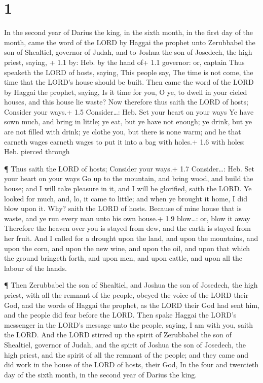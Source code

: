 \hypertarget{section}{%
\section{1}\label{section}}

 In the second year of Darius the king, in the sixth month,
in the first day of the month, came the word of the LORD by Haggai the
prophet unto Zerubbabel the son of Shealtiel, governor of Judah, and to
Joshua the son of Josedech, the high priest, saying, + 1.1 by: Heb. by
the hand of+ 1.1 governor: or, captain  Thus speaketh the
LORD of hosts, saying, This people say, The time is not come, the time
that the LORD's house should be built.  Then came the word
of the LORD by Haggai the prophet, saying,  Is it time for
you, O ye, to dwell in your cieled houses, and this house lie waste?
 Now therefore thus saith the LORD of hosts; Consider your
ways.+ 1.5 Consider\ldots: Heb. Set your heart on your ways 
Ye have sown much, and bring in little; ye eat, but ye have not enough;
ye drink, but ye are not filled with drink; ye clothe you, but there is
none warm; and he that earneth wages earneth wages to put it into a bag
with holes.+ 1.6 with holes: Heb. pierced through

 ¶ Thus saith the LORD of hosts; Consider your ways.+ 1.7
Consider\ldots: Heb. Set your heart on your ways  Go up to
the mountain, and bring wood, and build the house; and I will take
pleasure in it, and I will be glorified, saith the LORD.  Ye
looked for much, and, lo, it came to little; and when ye brought it
home, I did blow upon it. Why? saith the LORD of hosts. Because of mine
house that is waste, and ye run every man unto his own house.+ 1.9
blow\ldots: or, blow it away  Therefore the heaven over you
is stayed from dew, and the earth is stayed from her fruit.
 And I called for a drought upon the land, and upon the
mountains, and upon the corn, and upon the new wine, and upon the oil,
and upon that which the ground bringeth forth, and upon men, and upon
cattle, and upon all the labour of the hands.

 ¶ Then Zerubbabel the son of Shealtiel, and Joshua the son
of Josedech, the high priest, with all the remnant of the people, obeyed
the voice of the LORD their God, and the words of Haggai the prophet, as
the LORD their God had sent him, and the people did fear before the
LORD.  Then spake Haggai the LORD's messenger in the LORD's
message unto the people, saying, I am with you, saith the LORD.
 And the LORD stirred up the spirit of Zerubbabel the son
of Shealtiel, governor of Judah, and the spirit of Joshua the son of
Josedech, the high priest, and the spirit of all the remnant of the
people; and they came and did work in the house of the LORD of hosts,
their God,  In the four and twentieth day of the sixth
month, in the second year of Darius the king.

